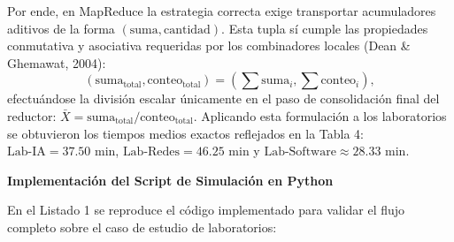 \documentclass[12pt,a4paper]{article}
\begin{document}
Por ende, en MapReduce la estrategia correcta exige transportar acumuladores aditivos de la forma $(\text{suma}, \text{cantidad})$. Esta tupla sí cumple las propiedades conmutativa y asociativa requeridas por los combinadores locales (Dean \& Ghemawat, 2004):
\begin{equation*}
    (\text{suma}_{\text{total}}, \text{conteo}_{\text{total}}) = \left( \sum \text{suma}_i, \sum \text{conteo}_i \right),
\end{equation*}
efectuándose la división escalar únicamente en el paso de consolidación final del reductor: $\bar{X} = \text{suma}_{\text{total}} / \text{conteo}_{\text{total}}$. Aplicando esta formulación a los laboratorios se obtuvieron los tiempos medios exactos reflejados en la Tabla 4: $\text{Lab-IA} = 37.50\text{ min}$, $\text{Lab-Redes} = 46.25\text{ min}$ y $\text{Lab-Software} \approx 28.33\text{ min}$.

\clearpage

\noindent\textbf{Implementación del Script de Simulación en Python}

En el Listado 1 se reproduce el código implementado para validar el flujo completo sobre el caso de estudio de laboratorios:
\end{document}
